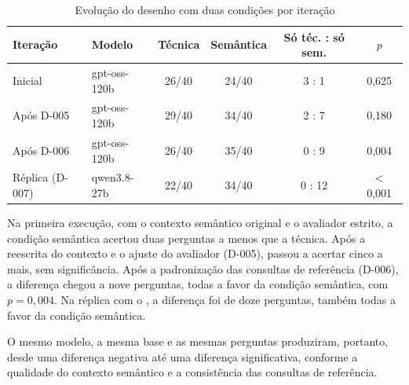 \begin{table}[htb]
  \centering
  \caption{Evolução do desenho com duas condições por iteração}
  \label{tab:historico}
  \begin{tabular}{llcccc}
    \toprule
    Iteração & Modelo & Técnica & Semântica & Só téc. : só sem. & $p$ \\
    \midrule
    Inicial         & gpt-oss-120b & 26/40 & 24/40 & 3 : 1  & 0,625 \\
    Após D-005      & gpt-oss-120b & 29/40 & 34/40 & 2 : 7  & 0,180 \\
    Após D-006      & gpt-oss-120b & 26/40 & 35/40 & 0 : 9  & 0,004 \\
    Réplica (D-007) & qwen3.8-27b  & 22/40 & 34/40 & 0 : 12 & $<$0,001 \\
    \bottomrule
  \end{tabular}
\end{table}

Na primeira execução, com o contexto semântico original e o avaliador
estrito, a condição semântica acertou duas perguntas a menos que a técnica.
Após a reescrita do contexto e o ajuste do avaliador (D-005), passou a
acertar cinco a mais, sem significância. Após a padronização das consultas
de referência (D-006), a diferença chegou a nove perguntas, todas a favor
da condição semântica, com $p = 0{,}004$. Na réplica com o
, a diferença foi de doze perguntas, também todas a favor
da condição semântica.

O mesmo modelo, a mesma base e as mesmas perguntas produziram, portanto,
desde uma diferença negativa até uma diferença significativa, conforme a
qualidade do contexto semântico e a consistência das consultas de
referência.
